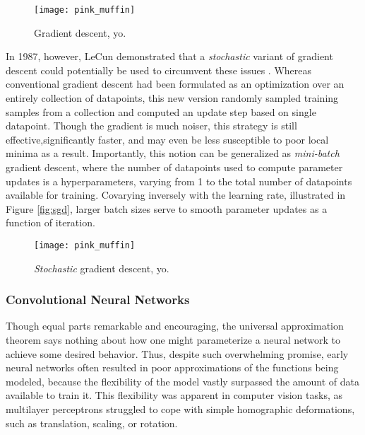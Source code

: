 \begin{figure}
\begin{centering}
\texttt{[image: pink\_muffin]}
\caption{Gradient descent, yo.}
\label{fig:local_min}
\end{centering}
\end{figure}

In 1987, however, LeCun demonstrated that a \emph{stochastic} variant of gradient descent could potentially be used to circumvent these issues \cite{LeCun1987}.
Whereas conventional gradient descent had been formulated as an optimization over an entirely collection of datapoints, this new version randomly sampled training samples from a collection and computed an update step based on single datapoint.
Though the gradient is much noiser, this strategy is still effective,significantly faster, and may even be less susceptible to poor local minima as a result.
Importantly, this notion can be generalized as \emph{mini-batch} gradient descent, where the number of datapoints used to compute parameter updates is a hyperparameters, varying from 1 to the total number of datapoints available for training.
Covarying inversely with the learning rate, illustrated in Figure \ref{fig:sgd}, larger batch sizes serve to smooth parameter updates as a function of iteration.

\begin{figure}
\begin{centering}
\texttt{[image: pink\_muffin]}
\caption{\emph{Stochastic} gradient descent, yo.}
\label{fig:local_min}
\end{centering}
\end{figure}

\subsubsection{Convolutional Neural Networks}
\label{subsec:convnets}


Though equal parts remarkable and encouraging, the universal approximation theorem says nothing about how one might parameterize a neural network to achieve some desired behavior.
Thus, despite such overwhelming promise, early neural networks often resulted in poor approximations of the functions being modeled, because the flexibility of the model vastly surpassed the amount of data available to train it.
This flexibility was apparent in computer vision tasks, as multilayer perceptrons struggled to cope with simple homographic deformations, such as translation, scaling, or rotation.

